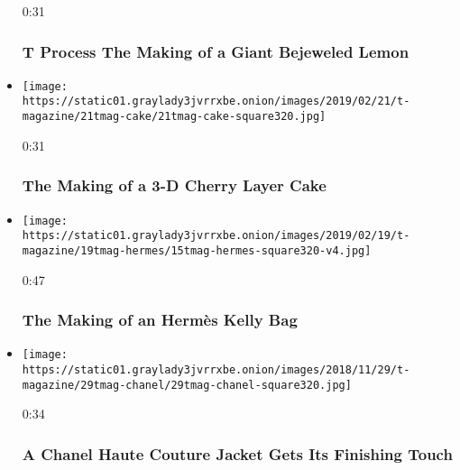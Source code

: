 \begin{itemize}
  0:31

  \hypertarget{t-process--the-making-of-a-giant-bejeweled-lemon}{%
  \subsubsection{T Process \textbar{} The Making of a Giant Bejeweled
  Lemon}\label{t-process--the-making-of-a-giant-bejeweled-lemon}}
\item
  \href{https://www.nytimes3xbfgragh.onion/video/t-magazine/100000006363367/the-making-of-a-3-d-cherry-layer-cake.html?action=click\&module=video-series-bar\&region=header\&pgtype=Article\&playlistId=video/t-process}{}

  \texttt{[image: https://static01.graylady3jvrrxbe.onion/images/2019/02/21/t-magazine/21tmag-cake/21tmag-cake-square320.jpg]}

  0:31

  \hypertarget{the-making-of-a-3-d-cherry-layer-cake}{%
  \subsubsection{The Making of a 3-D Cherry Layer
  Cake}\label{the-making-of-a-3-d-cherry-layer-cake}}
\item
  \href{https://www.nytimes3xbfgragh.onion/video/t-magazine/fashion/100000006361342/the-making-of-an-hermes-kelly-bag.html?action=click\&module=video-series-bar\&region=header\&pgtype=Article\&playlistId=video/t-process}{}

  \texttt{[image: https://static01.graylady3jvrrxbe.onion/images/2019/02/19/t-magazine/19tmag-hermes/15tmag-hermes-square320-v4.jpg]}

  0:47

  \hypertarget{the-making-of-an-hermuxe8s-kelly-bag}{%
  \subsubsection{The Making of an Hermès Kelly
  Bag}\label{the-making-of-an-hermuxe8s-kelly-bag}}
\item
  \href{https://www.nytimes3xbfgragh.onion/video/t-magazine/100000006237069/a-chanel-haute-couture-jacket-gets-its-finishing-touch.html?action=click\&module=video-series-bar\&region=header\&pgtype=Article\&playlistId=video/t-process}{}

  \texttt{[image: https://static01.graylady3jvrrxbe.onion/images/2018/11/29/t-magazine/29tmag-chanel/29tmag-chanel-square320.jpg]}

  0:34

  \hypertarget{a-chanel-haute-couture-jacket-gets-its-finishing-touch}{%
  \subsubsection{A Chanel Haute Couture Jacket Gets Its Finishing
  Touch}\label{a-chanel-haute-couture-jacket-gets-its-finishing-touch}}
\end{itemize}

